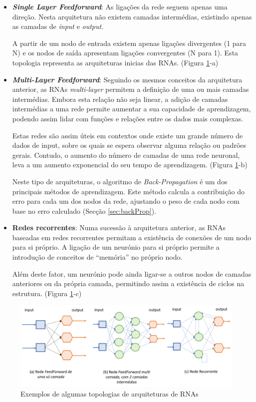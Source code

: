 \begin{itemize}
    \item \textbf{\textit{Single Layer Feedforward}}: As ligações da rede seguem apenas uma direção. Nesta arquitetura não existem camadas intermédias, existindo apenas as camadas de \textit{input} e \textit{output}. 
    
    A partir de um nodo de entrada existem apenas ligações divergentes (1 para N)  e os nodos de saída apresentam ligações convergentes (N para 1). Esta topologia representa as arquiteturas inicias das RNAs. (Figura \ref{fig:arquiteturas}-a)
    
    \item \textbf{\textit{Multi-Layer Feedforward}}: Seguindo os mesmos conceitos da arquitetura anterior, as RNAs \textit{multi-layer} permitem a definição de uma ou mais camadas intermédias. 
    Embora esta relação não seja linear, a adição de camadas intermédias a uma rede permite aumentar a sua capacidade de aprendizagem, podendo assim lidar com funções e relações entre os dados mais complexas. 
    
    Estas redes são assim úteis em contextos onde existe um grande número de dados de input, sobre os quais se espera observar alguma relação ou padrões gerais. Contudo, o aumento do número de camadas de uma rede neuronal, leva a um aumento exponencial do seu tempo de aprendizagem. (Figura \ref{fig:arquiteturas}-b)
    
    Neste tipo de arquiteturas, o algoritmo de \textit{Back-Propagation} é um dos principais métodos de aprendizagem. Este método calcula a contribuição do erro para cada um dos nodos da rede, ajustando o peso de cada nodo com base no erro calculado (Secção \ref{sec:backProp}). 

    \item \textbf{Redes recorrentes}: Numa sucessão à arquitetura anterior, as RNAs baseadas em  redes recorrentes permitam a existência de conexões de um nodo para si próprio. A ligação de um neurónio para si próprio permite a introdução de conceitos de “memória” no próprio nodo. 
    
    Além deste fator, um neurónio pode ainda ligar-se a outros nodos de camadas anteriores ou da própria camada, permitindo assim a existência de ciclos na estrutura. (Figura \ref{fig:arquiteturas}-c)
\end{itemize}

\begin{figure}
    \hspace{-0.2in}
    \includegraphics[scale=0.5]{Imagens/topos.png}
    \caption{Exemplos de algumas topologias de arquiteturas de RNAs}
    \label{fig:arquiteturas}
\end{figure}

